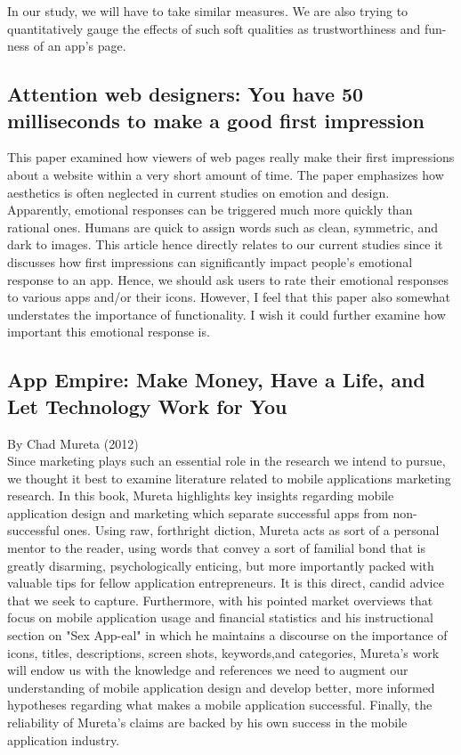 \documentclass{article}
\begin{document}
In our study, we will have to take similar measures. We are also trying to quantitatively gauge the effects of such soft qualities as trustworthiness and fun-ness of an app's page.

\subsection{Attention web designers: You have 50 milliseconds to make a good
first impression}

This paper examined how viewers of web pages really make their first impressions about a website within a very short amount of time. The paper emphasizes how aesthetics is often neglected in current studies on emotion and design. Apparently, emotional responses can be triggered much more quickly than rational ones. Humans are quick to assign words such as clean, symmetric, and dark to images. This article hence directly relates to our current studies since it discusses how first impressions can significantly impact people's emotional response to an app. Hence, we should ask users to rate their emotional responses to various apps and/or their icons. However, I feel that this paper also somewhat understates the importance of functionality. I wish it could further examine how important this emotional response is.

\subsection{App Empire: Make Money, Have a Life, and Let Technology Work for You}

By Chad Mureta (2012) \\

Since marketing plays such an essential role in the research we intend to pursue, we thought it best to examine literature related to mobile applications marketing research. In this book, Mureta highlights key insights regarding mobile application design and marketing which separate successful apps from non-successful ones.  Using raw, forthright diction, Mureta acts as sort of a personal mentor to the reader, using words that convey a sort of familial bond that is greatly disarming, psychologically enticing, but more importantly packed with valuable tips for fellow application entrepreneurs.  It is this direct, candid advice that we seek to capture.  Furthermore, with his pointed market overviews that focus on mobile application usage and financial statistics and his instructional section on "Sex App-eal" in which he maintains a discourse on the importance of icons, titles, descriptions, screen shots, keywords,and categories, Mureta's work will endow us with the knowledge and references we need to augment our understanding of mobile application design and develop better, more informed hypotheses regarding what makes a mobile application successful. Finally, the reliability of Mureta's claims are backed by his own success in the mobile application industry.\cite {mureta} \\
\end{document}
